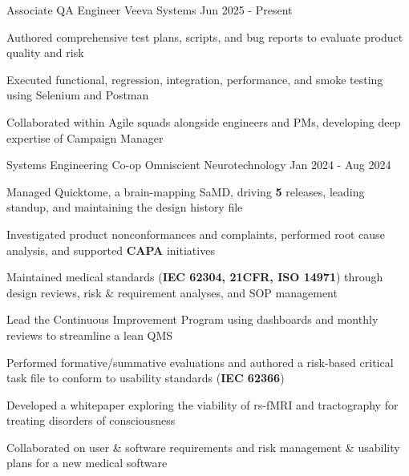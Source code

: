 \documentclass[11pt, a4paper]{russell}
\begin{document}
\begin{cventries}
\cventry
  {Associate QA Engineer} %
  {Veeva Systems} %
  {} %
  {Jun 2025 - Present} %
  {
    \begin{cvitems}
        \item {Authored comprehensive test plans, scripts, and bug reports to evaluate product quality and risk}
        \item {Executed functional, regression, integration, performance, and smoke testing using Selenium and Postman}
        \item {Collaborated within Agile squads alongside engineers and PMs, developing deep expertise of Campaign Manager}
    \end{cvitems}
  }
\cventry
  {Systems Engineering Co-op} %
  {Omniscient Neurotechnology} %
  {} %
  {Jan 2024 - Aug 2024} %
  {
    \begin{cvitems}
        \item {Managed Quicktome, a brain-mapping SaMD, driving \textbf{5} releases, leading standup, and maintaining the design history file}
        \item {Investigated product nonconformances and complaints, performed root cause analysis, and supported \textbf{CAPA} initiatives}
        \item {Maintained medical standards (\textbf{IEC 62304, 21CFR, ISO 14971}) through design reviews, risk \& requirement analyses, and SOP management}
        \item {Lead the Continuous Improvement Program using dashboards and monthly reviews to streamline a lean QMS}
        \item {Performed formative/summative evaluations and authored a risk-based critical task file to conform to usability standards (\textbf{IEC 62366})}
        \item {Developed a whitepaper exploring the viability of rs-fMRI and tractography for treating disorders of consciousness}
        \item {Collaborated on user \& software requirements and risk management \& usability plans for a new medical software}
    \end{cvitems}
  }


\end{cventries}
\end{document}
